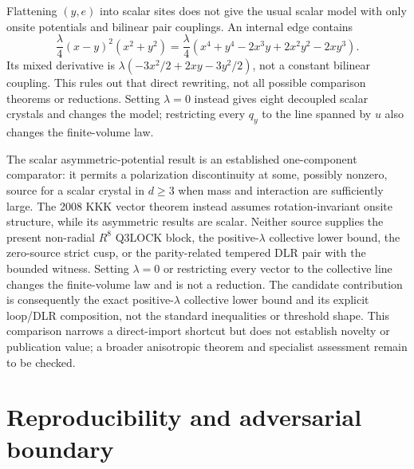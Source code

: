\documentclass[11pt]{article}
\numberwithin{equation}{section}
\theoremstyle{definition}
\begin{document}
Flattening $(y,e)$ into scalar sites does not give the usual scalar model
with only onsite potentials and bilinear pair couplings. An internal edge
contains
\begin{equation}
 \frac\lambda4(x-y)^2(x^2+y^2)
 =\frac\lambda4(x^4+y^4-2x^3y+2x^2y^2-2xy^3).
 \label{eq:nonbilinear-scalar-obstruction}
\end{equation}
Its mixed derivative is $\lambda(-3x^2/2+2xy-3y^2/2)$, not a
constant bilinear coupling. This rules out that direct rewriting, not all
possible comparison theorems or reductions. Setting $\lambda=0$ instead
gives eight decoupled scalar crystals and changes the model; restricting
every $q_y$ to the line spanned by $u$ also changes the finite-volume law.

The scalar asymmetric-potential result \cite[Theorem 1.4]{KK-asym} is an
established one-component comparator: it permits a polarization discontinuity
at some, possibly nonzero, source for a scalar crystal in $d\geq3$ when mass
and interaction are sufficiently large. The 2008 KKK vector theorem instead
assumes rotation-invariant onsite structure, while its asymmetric results are
scalar. Neither source supplies the present non-radial $R^8$ Q3LOCK block, the
positive-$\lambda$ collective lower bound, the zero-source strict cusp, or the
parity-related tempered DLR pair with the bounded witness. Setting
$\lambda=0$ or restricting every vector to the collective line changes the
finite-volume law and is not a reduction. The candidate contribution is
consequently the exact positive-$\lambda$ collective lower bound and its
explicit loop/DLR composition, not the standard inequalities or threshold
shape. This comparison narrows a direct-import shortcut but does not establish
novelty or publication value; a broader anisotropic theorem and specialist
assessment remain to be checked.
\section{Reproducibility and adversarial boundary}
\label{sec:repro}
\end{document}

